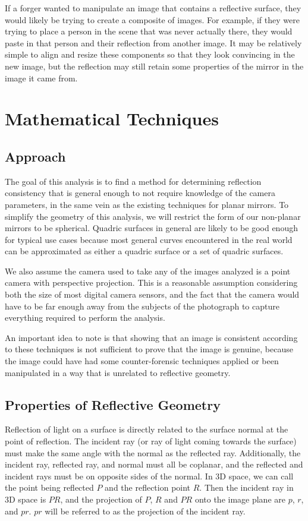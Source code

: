 \documentclass{thesis}
\begin{document}
If a forger wanted to manipulate an image that contains a reflective surface, they would likely be trying to create a composite of images. For example, if they were trying to place a person in the scene that was never actually there, they would paste in that person and their reflection from another image. It may be relatively simple to align and resize these components so that they look convincing in the new image, but the reflection may still retain some properties of the mirror in the image it came from.




\chapter{Mathematical Techniques}
\section{Approach}
The goal of this analysis is to find a method for determining reflection consistency that is general enough to not require knowledge of the camera parameters, in the same vein as the existing techniques for planar mirrors. To simplify the geometry of this analysis, we will restrict the form of our non-planar mirrors to be spherical. Quadric surfaces in general are likely to be good enough for typical use cases because most general curves encountered in the real world can be approximated as either a quadric surface or a set of quadric surfaces.

We also assume the camera used to take any of the images analyzed is a point camera with perspective projection. This is a reasonable assumption considering both the size of most digital camera sensors, and the fact that the camera would have to be far enough away from the subjects of the photograph to capture everything required to perform the analysis.

An important idea to note is that showing that an image is consistent according to these techniques is not sufficient to prove that the image is genuine, because the image could have had some counter-forensic techniques applied or been manipulated in a way that is unrelated to reflective geometry.

\section{Properties of Reflective Geometry}
Reflection of light on a surface is directly related to the surface normal at the point of reflection. The incident ray (or ray of light coming towards the surface) must make the same angle with the normal as the reflected ray.  Additionally, the incident ray, reflected ray, and normal must all be coplanar, and the reflected and incident rays must be on opposite sides of the normal. In 3D space, we can call the point being reflected $P$ and the reflection point $R$. Then the incident ray in 3D space is $PR$, and the projection of $P$, $R$ and $PR$ onto the image plane are $p$, $r$, and $pr$. $pr$ will be referred to as the projection of the incident ray.
\end{document}
